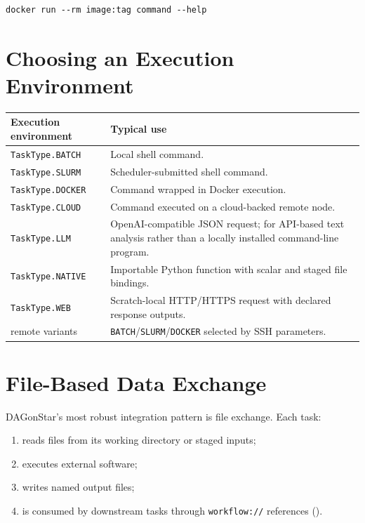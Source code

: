 \begin{lstlisting}[style=bash, caption={Verifying a containerized tool.}]
docker run --rm image:tag command --help
\end{lstlisting}

\section{Choosing an Execution Environment}

\begin{center}
\begin{tabular}{@{}ll@{}}
\toprule
\textbf{Execution environment} & \textbf{Typical use} \\
\midrule
\texttt{TaskType.BATCH}  & Local shell command. \\
\texttt{TaskType.SLURM}  & Scheduler-submitted shell command. \\
\texttt{TaskType.DOCKER} & Command wrapped in Docker execution. \\
\texttt{TaskType.CLOUD}  & Command executed on a cloud-backed remote node. \\
\texttt{TaskType.LLM}    & OpenAI-compatible JSON request; for API-based text
  analysis rather than a locally installed command-line program. \\
\texttt{TaskType.NATIVE} & Importable Python function with scalar and staged
  file bindings. \\
\texttt{TaskType.WEB}    & Scratch-local HTTP/HTTPS request with declared
  response outputs. \\
remote variants & \texttt{BATCH}/\texttt{SLURM}/\texttt{DOCKER} selected by
  SSH parameters. \\
\bottomrule
\end{tabular}
\end{center}

\section{File-Based Data Exchange}

DAGonStar's most robust integration pattern is file exchange. Each task:

\begin{enumerate}[leftmargin=1.6em]
  \item reads files from its working directory or staged inputs;
  \item executes external software;
  \item writes named output files;
  \item is consumed by downstream tasks through \texttt{workflow://}
    references ().
\end{enumerate}

